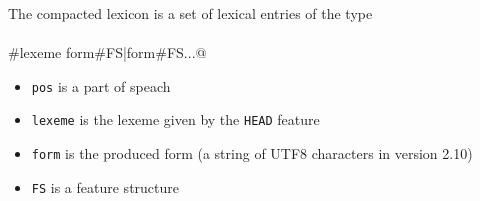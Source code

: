 \documentclass[11pt]{article}
\begin{document}
The compacted lexicon is a set of lexical entries of the type

\paragraph{}\verb@pos#lexeme	form#FS|form#FS...@

\begin{itemize}
\item \verb#pos# is a part of speach
\item \verb#lexeme# is the lexeme given by the \verb#HEAD# feature
\item \verb#form# is the produced form (a string of UTF8 characters in version 2.10)
\item \verb#FS# is a feature structure
\end{itemize}
\end{document}
